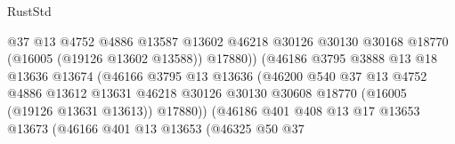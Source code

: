 \begin{lexlean}{RustStd}
\begin{coremodule}
                                          @37
                                          @13
                                          @4752
                                          @4886
                                          @13587
                                          @13602
                                          @46218
                                          @30126
                                          @30130
                                          @30168
                                          @18770
                                          (@16005 (@19126 @13602 @13588))
                                          @17880))
                                      (@46186
                                        @3795
                                        @3888
                                        @13
                                        @18
                                        @13636
                                        @13674
                                        (@46166
                                          @3795
                                          @13
                                          @13636
                                          (@46200
                                            @540
                                            @37
                                            @13
                                            @4752
                                            @4886
                                            @13612
                                            @13631
                                            @46218
                                            @30126
                                            @30130
                                            @30608
                                            @18770
                                            (@16005 (@19126 @13631 @13613))
                                            @17880))
                                        (@46186
                                          @401
                                          @408
                                          @13
                                          @17
                                          @13653
                                          @13673
                                          (@46166
                                            @401
                                            @13
                                            @13653
                                            (@46325
                                              @50
                                              @37

\end{coremodule}
\end{lexlean}
